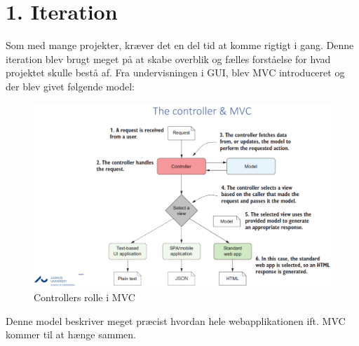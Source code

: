 \section{1. Iteration}

Som med mange projekter, kræver det en del tid at komme rigtigt i gang. Denne iteration blev brugt meget på at skabe overblik og fælles forståelse for hvad projektet skulle bestå af. Fra undervisningen i GUI, blev MVC introduceret og der blev givet følgende model\cite{mvcControllerModel}:
\begin{figure}[hbt]
    \centering
    \includegraphics[scale=0.5]{Images/Arkitektur/MVC_Controller.png}
    \caption{Controllers rolle i MVC}
    \label{fig:MVC_Controller}
\end{figure}

Denne model beskriver meget præcist hvordan hele webapplikationen ift. MVC kommer til at hænge sammen.






